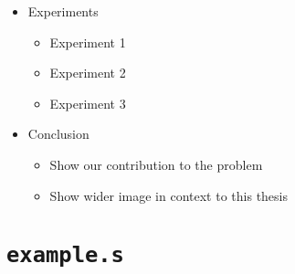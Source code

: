 \documentclass[12pt, twoside]{fithesis2}
\renewcommand{\_}{\leavevmode \kern0.07em\vbox{\hrule width0.4em}}
\newcommand{\squarebullet}{\textcolor{black}{\raisebox{0.15em}{\rule{4pt}{4pt}}}}
\newenvironment{myItemize}{
  \begin{itemize}[
    leftmargin=2em,
    rightmargin=1em,
    itemsep=\parskip,
    parsep=0em,
    topsep=0em,
    partopsep=0em
]
  \renewcommand{\labelitemi}{\squarebullet}
  \renewcommand{\labelitemii}{\textbullet}
}{
  \end{itemize}
}
\begin{document}
\begin{myItemize}
\item Experiments
    \begin{myItemize}
    \item Experiment 1
    \item Experiment 2
    \item Experiment 3
    \end{myItemize}

\item Conclusion
    \begin{myItemize}
    \item Show our contribution to the problem
    \item Show wider image in context to this thesis
    \end{myItemize}

\end{myItemize}



\chapter{\texttt{example.s}}
\label{appendix:example}
\end{document}

